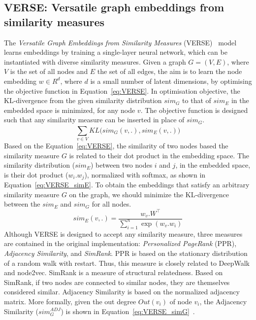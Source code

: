 \subsection{VERSE: Versatile graph embeddings from similarity measures}
\label{subsec:VERSE}
The \emph{Versatile Graph Embeddings from Similarity Measures} (VERSE)~ model learns embeddings by training a single-layer neural network, which can be instantiated with diverse similarity measures. Given a graph $G=(V,E)$, where $V$ is the set of all nodes and $E$ the set of all edges, the aim is to learn the node embedding $w \in R^{d}$, where $d$ is a small number of latent dimensions, by optimising the objective function in Equation~\ref{eq:VERSE}. In optimisation objective, the KL-divergence from the given similarity distribution $sim_G$ to that of $sim_E$ in the embedded space is minimized, for any node $v$. The objective function is designed such that any similarity measure can be inserted in place of $sim_G$. 
\begin{equation}
\sum _{ v\in V }^{  }{ KL(sim_{ G }(v,.),sim_{ E } } (v,.))
\label{eq:VERSE}
\end{equation}
Based on the Equation~\ref{eq:VERSE}, the similarity of two nodes based the similarity measure $G$ is related to their dot product in the embedding space. The similarity distribution ($sim_E$) between two nodes $i$ and $j$, in the embedded space, is their dot product ($w_i . w_j$), normalized with softmax, as shown in Equation~\ref{eq:VERSE_simE}. To obtain the embeddings that satisfy an arbitrary similarity measure $G$ on the graph, we should minimize the KL-divergence between the $sim_{ E }$ and $sim_{G}$ for all nodes. 
\begin{equation}
sim_{ E }(v,.)=\frac{ w_{ v }.W^\top }{ \sum _{ i=1 }^{ n }{ \exp{(w_{ v }.w_{ i }) }}  }\label{eq:VERSE_simE}
\end{equation}
Although VERSE is designed to accept any similarity measure, three measures are contained in the original implementation: \emph{Personalized PageRank} (PPR),  \emph{Adjacency Similarity}, and  \emph{SimRank}. PPR is based on the stationary distribution of a random walk with restart. Thus, this measure is closely related to DeepWalk and node2vec. SimRank is a measure of structural relatedness. Based on SimRank, if two nodes are connected to similar nodes, they are themselves considered similar. Adjacency Similarity is based on the normalized adjacency matrix. More formally, given the out degree $Out(v_{i})$ of node $v_{i}$, the Adjacency Similarity ($sim^{ ADJ }_{ G }$) is shown in Equation~\ref{eq:VERSE_simG}~. 
